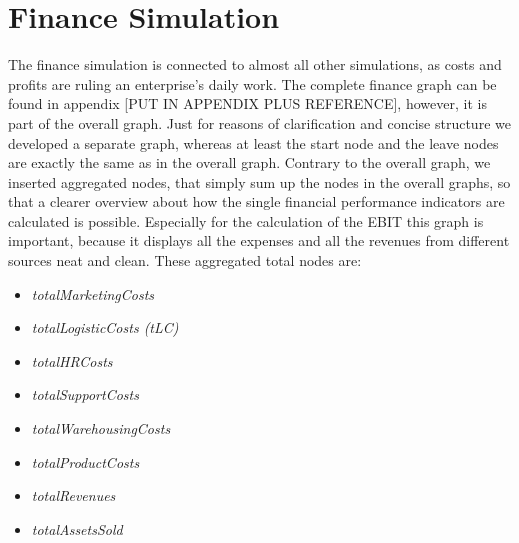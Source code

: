 \section{Finance Simulation}
\label{sec:finance_simulation}

The finance simulation is connected to almost all other simulations, as costs and profits are ruling an enterprise's daily work. The complete finance graph can be found in appendix [PUT IN APPENDIX PLUS REFERENCE], however, it is part of the overall graph. Just for reasons of clarification and concise structure we developed a separate graph, whereas at least the start node and the leave nodes are exactly the same as in the overall graph. Contrary to the overall graph, we inserted aggregated nodes, that simply sum up the nodes in the overall graphs, so that a clearer overview about how the single financial performance indicators are calculated is possible. Especially for the calculation of the \gls{EBIT} this graph is important, because it displays all the expenses and all the revenues from different sources neat and clean. These aggregated total nodes are:
\begin{itemize}
    \item \textit{totalMarketingCosts}
    \item \textit{totalLogisticCosts (tLC)}
    \item \textit{totalHRCosts}
    \item \textit{totalSupportCosts}
    \item \textit{totalWarehousingCosts}
    \item \textit{totalProductCosts}
    \item \textit{totalRevenues}
    \item \textit{totalAssetsSold}
\end{itemize}


